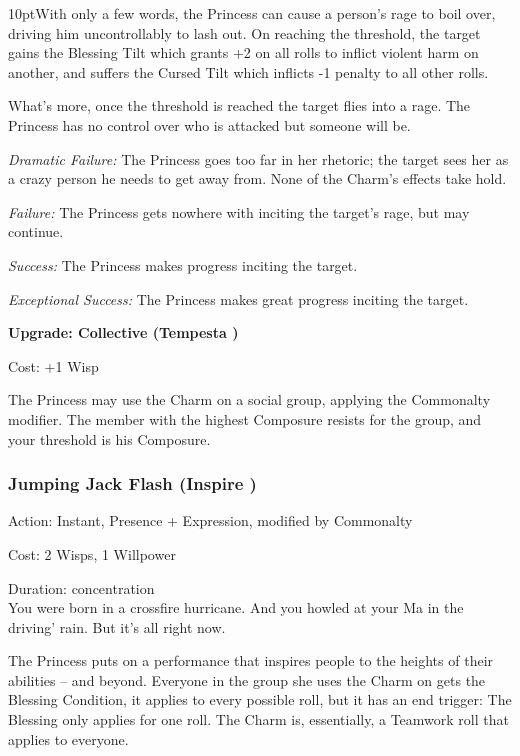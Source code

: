 \begin{myindentpar}{10pt}\noindent With only a few words, the Princess can cause a person's rage to boil over, driving him uncontrollably to lash out. On reaching the threshold, the target gains the Blessing Tilt which grants +2 on all rolls to inflict violent harm on another, and suffers the Cursed Tilt which inflicts -1 penalty to all other rolls. 

What's more, once the threshold is reached the target flies into a rage. The Princess has no control over who is attacked but someone will be.

    \emph{Dramatic Failure:} The Princess goes too far in her rhetoric; the target sees her as a crazy person he needs to get away from. None of the Charm's effects take hold.

    \emph{Failure:} The Princess gets nowhere with inciting the target's rage, but may continue.

    \emph{Success:} The Princess makes progress inciting the target.

    \emph{Exceptional Success:} The Princess makes great progress inciting the target.

\textbf{Upgrade: Collective (Tempesta \textbullet\textbullet\textbullet\textbullet)}

\noindent Cost: +1 Wisp

The Princess may use the Charm on a social group, applying the Commonalty modifier. The member with the highest Composure resists for the group, and your threshold is his Composure.\end{myindentpar}

\subsubsection*{Jumping Jack Flash (Inspire \textbullet\textbullet\textbullet\textbullet\textbullet)}

\noindent Action: Instant, Presence + Expression, modified by Commonalty

\noindent Cost: 2 Wisps, 1 Willpower

\noindent Duration: concentration\\ 

\noindent You were born in a crossfire hurricane. And you howled at your Ma in the driving' rain. But it's all right now.

The Princess puts on a performance that inspires people to the heights of their abilities -- and beyond. Everyone in the group she uses the Charm on gets the Blessing Condition, it applies to every possible roll, but it has an end trigger: The Blessing only applies for one roll. The Charm is, essentially, a Teamwork roll that applies to everyone. 

